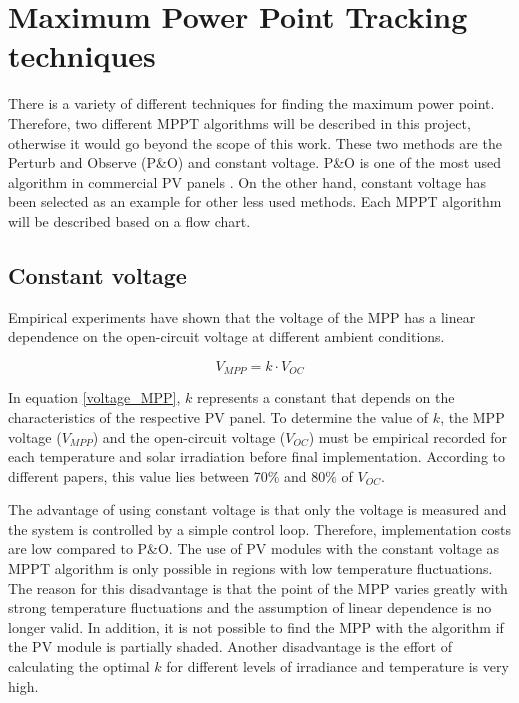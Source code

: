 \section{Maximum Power Point Tracking techniques\label{MPPTalgo}}

There is a variety of different techniques for finding the maximum power point. Therefore, two different MPPT algorithms will be described in this project, otherwise it would go beyond the scope of this work. These two methods are the Perturb and Observe (P\&O) and constant voltage. P\&O is one of the most used algorithm in commercial PV panels \cite{Dezso}. On the other hand, constant voltage has been selected as an example for other less used methods. Each MPPT algorithm will be described based on a flow chart. 

\subsection{Constant voltage}
Empirical experiments have shown that the voltage of the MPP has a linear dependence on the open-circuit voltage at different ambient conditions\cite{flowchartVC}.

\begin{equation} \label{voltage_MPP}
V_{MPP} = k \cdot V_{OC}	
\end{equation} 

In equation \ref{voltage_MPP}, $k$ represents a constant that depends on the characteristics of the respective PV panel. To determine the value of $k$, the MPP voltage ($V_{MPP}$) and the open-circuit voltage ($V_{OC}$) must be empirical recorded for each temperature and solar irradiation before final implementation. According to different papers, this value lies between 70\% and 80\% of $V_{OC}$.\cite{MPPTResearch}\cite{MPPTConstV}


The advantage of using constant voltage is that only the voltage is measured and the system is controlled by a simple control loop. Therefore, implementation costs are low compared to P\&O. The use of PV modules with the constant voltage as MPPT algorithm is only possible in regions with low temperature fluctuations. The reason for this disadvantage is that the point of the MPP varies greatly with strong temperature fluctuations and the assumption of linear dependence is no longer valid. In addition, it is not possible to find the MPP with the algorithm if the PV module is partially shaded. Another disadvantage is the effort of calculating the optimal $k$ for different levels of irradiance and temperature is very high.\cite{flowchartVC} \cite{MPPTConstV}



